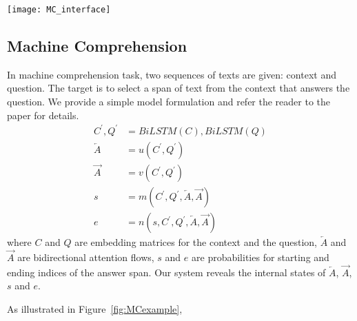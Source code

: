 \begin{figure*}[t]
\centering
\vspace{-2mm}
 \texttt{[image: MC\_interface]}
  \vspace{-6mm}
 \caption{
An illustrate of an attention exploration session with the machine comprehension model.
}
\label{fig:MCexample}
\end{figure*}

\subsection{Machine Comprehension}
\label{sec:MCexample}
In machine comprehension task, two sequences of texts are given: context and question.
The target is to select a span of text from the context that answers the question. We provide a simple model
formulation and refer the reader to the paper for details.
\begin{align}
	C^\prime, Q^\prime &= BiLSTM(C), BiLSTM(Q)\\
	\overleftarrow{A} &= u(C^\prime, Q^\prime)\\
	\overrightarrow{A} &= v(C^\prime, Q^\prime)\\
	s &= m(C^\prime, Q^\prime, \overleftarrow{A}, \overrightarrow{A})\\
	e &= n(s, C^\prime, Q^\prime, \overleftarrow{A}, \overrightarrow{A})
\end{align}
where $C$ and $Q$ are embedding matrices for the context and the question,
$\overleftarrow{A}$ and $\overrightarrow{A}$ are bidirectional attention flows,
$s$ and $e$ are probabilities for starting and ending indices of the answer span.
Our system reveals the internal states of $\overleftarrow{A}$, $\overrightarrow{A}$,
$s$ and $e$.

As illustrated in Figure~\ref{fig:MCexample},
